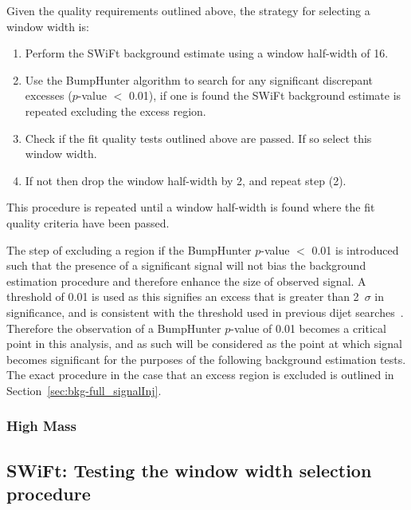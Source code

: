 \noindent
Given the quality requirements outlined above, the strategy for selecting a window width is:
\begin{enumerate}
\item Perform the SWiFt background estimate using a window half-width of 16.
\item Use the {\sc BumpHunter} algorithm to search for any significant discrepant excesses (\mbox{$p$-value} $<$ 0.01),
  if one is found the SWiFt background estimate is repeated excluding the excess region.
\item Check if the fit quality tests outlined above are passed. If so select this window width.
\item If not then drop the window half-width by 2, and repeat step (2).
\end{enumerate}
This procedure is repeated until a window half-width is found where the fit quality criteria have been passed.

The step of excluding a region if the {\sc BumpHunter} \mbox{$p$-value} $<$ 0.01 is introduced such that
the presence of a significant signal will not bias the background estimation procedure and therefore enhance the size of observed signal.
A threshold of 0.01 is used as this signifies an excess that is greater than 2~$\sigma$ in significance,
and is consistent with the threshold used in previous dijet searches~\cite{det-thesis_kate}.
Therefore the observation of a {\sc BumpHunter} \mbox{$p$-value} of 0.01 becomes a critical point in this analysis,
and as such will be considered as the point at which signal becomes significant for the purposes of the following background estimation tests.
The exact procedure in the case that an excess region is excluded is outlined in Section~\ref{sec:bkg-full_signalInj}.


\subsubsection{High Mass} 
\label{sec:bkg-full_highmass_windowSel}

\subsection{SWiFt: Testing the window width selection procedure}
\label{sec:bkg-full_windowSelTests} 

